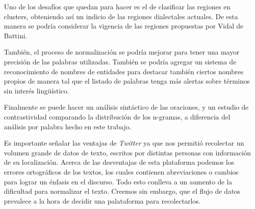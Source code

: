 Uno de los desafíos que quedan para hacer es el de clasificar las regiones en clusters, obteniendo así un indicio de las regiones dialectales actuales. De esta manera se podría considerar la vigencia de las regiones propuestas por Vidal de Battini. %

También, el proceso de normalización se podría mejorar para tener una mayor precisión de las palabras utilizadas. También se podría agregar un sistema de reconocimiento de nombres de entidades para destacar también ciertos nombres propios de manera tal que el listado de palabras tenga más alertas sobre términos sin interés lingüístico.


Finalmente se puede hacer un análisis sintáctico de las oraciones, y un estudio de contrastividad comparando la distribución de los n-gramas, a diferencia del análisis por palabra hecho en este trabajo.

Es importante señalar las ventajas de \textit{Twitter} ya que nos permitió recolectar un volumen grande de datos de texto, escritos por distintas personas con información de su localización. 
Acerca de las desventajas de esta plataforma podemos los errores ortográficos de los textos, los cuales contienen abreviaciones o cambios para lograr un énfasis en el discurso. Todo esto conlleva a un aumento de la dificultad para normalizar el texto. Creemos sin embargo, que el flujo de datos prevalece a la hora de decidir una palataforma para recolectarlos.

